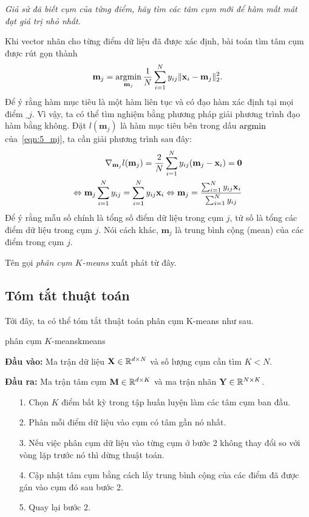 \textit{Giả sử đã biết cụm của từng điểm, hãy tìm các tâm
cụm mới để hàm mất mát đạt giá trị nhỏ nhất.}

Khi vector nhãn cho từng điểm dữ liệu đã được xác định, bài toán
tìm tâm cụm được rút gọn thành
\begin{equation}
\label{eqn:5_mj}
\mathbf{m}_j = \operatorname*{argmin}_{\mathbf{m}_j} \frac{1}{N}\sum_{i = 1}^{N}
y_{ij}\|\mathbf{x}_i - \mathbf{m}_j \|_2^2.
\end{equation}
Để ý rằng hàm mục tiêu là một hàm liên tục và có đạo hàm xác định tại mọi điểm
$\bm_j$. Vì vậy, ta có thể tìm nghiệm bằng phương pháp giải phương trình đạo hàm
bằng không. Đặt $l(\mathbf{m}_j)$ là hàm mục tiêu bên trong dấu $\operatorname*{argmin}$
của~\eqref{eqn:5_mj}, ta cần giải phương trình sau đây:
\begin{eqnarray}
\label{eqn:4_mj2}
\nabla_{\mathbf{m}_j} l(\mathbf{m}_j) =  \frac{2}{N}\sum_{i=1}^N
y_{ij}(\mathbf{m}_j - \mathbf{x}_i) = \mathbf{0} \\
\Leftrightarrow\mathbf{m}_j \sum_{i=1}^N y_{ij} = \sum_{i=1}^N y_{ij}
\mathbf{x}_i
\Leftrightarrow \mathbf{m}_j = \frac{ \sum_{i=1}^N y_{ij}
\mathbf{x}_i}{\sum_{i=1}^N y_{ij}}
\end{eqnarray}
Để ý rằng mẫu số chính là tổng {số điểm dữ liệu} trong cụm $j$, tử số là
{tổng các điểm dữ liệu} trong cụm $j$. Nói cách khác, $\mathbf{m}_j$
{là trung bình cộng (mean) của các điểm trong cụm} $j$.

Tên gọi \textit{phân cụm $K$-means} xuất phát từ đây.

\subsection{Tóm tắt thuật toán}
Tới đây, ta có thể tóm tắt thuật toán phân cụm K-means như sau.
\begin{myalg}{phân cụm $K$-means}{kmeans}

\textbf{Đầu vào:} Ma trận dữ liệu $\mathbf{X} \in \mathbb{R}^{d \times N}$ và số lượng
cụm cần tìm $K < N$.

\textbf{Đầu ra:} Ma trận tâm cụm $\mathbf{M} \in \mathbb{R}^{d \times K}$ và ma trận
nhãn $\mathbf{Y} \in \mathbb{R}^{N\times K}$.

\begin{enumerate}
\item[1.] Chọn $K$ điểm bất kỳ trong tập huấn luyện làm các tâm cụm ban đầu.

\item[2.]  Phân mỗi điểm dữ liệu vào cụm có tâm gần nó nhất.

\item[3.]  Nếu việc phân cụm dữ liệu vào từng cụm ở bước 2 không thay đổi
so với vòng lặp trước nó thì dừng thuật toán.

\item[4.]  Cập nhật tâm cụm bằng cách lấy trung bình cộng của các điểm đã được gán vào cụm đó sau bước 2.

\item[5.]  Quay lại bước 2.
\end{enumerate}
\end{myalg}


